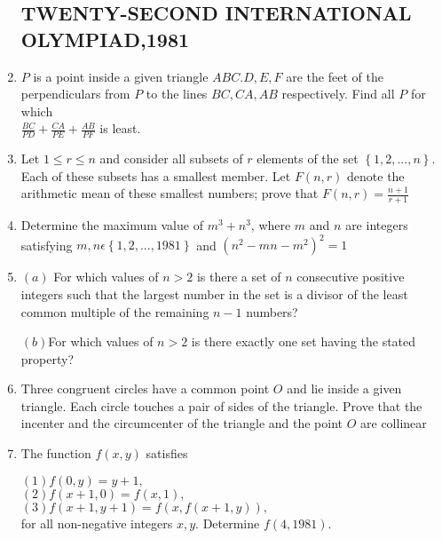 \documentclass[12pt,-letter paper]{article}
\providecommand{\cbrak}[1]{\ensuremath{\left\{#1\right\}}}
\providecommand{\brak}[1]{\ensuremath{\left(#1\right)}}
\begin{document}
\begin{enumerate}
		\subsection*{TWENTY-SECOND INTERNATIONAL OLYMPIAD,1981}
\item $P$ is a point inside a given triangle $ABC.D, E, F$ are the feet of the perpendiculars from $P$ to the lines $BC, CA, AB$ respectively. Find all $P$ for which \\ $\frac{BC}{PD}+\frac{CA}{PE}+\frac{AB}{PF}$ is least.
\item Let $1 \leq r \leq n$ and consider all subsets of $r$ elements of the set $\cbrak{1,2,..., n}$. Each of these subsets has a smallest  member. Let $F\brak{n,r}$ denote the arithmetic mean of these smallest numbers; prove that $F\brak{n,r}= \frac{n+1}{r+1}$
\item Determine the maximum value of $m^{3}+n^{3}$, where $m$ and $n$ are integers satisfying $m, n  \epsilon  \cbrak{1,2,..., 1981}$ and $\brak{n^{2}-mn-m^{2}}^{2}=1$
\item \brak{a} For which values of $n > 2$ is there a set of $n$ consecutive positive integers such that the largest number in the set is a divisor of the least common multiple of the remaining $n-1$ numbers?

	\brak{b}For which values of $n > 2$ is there exactly one set having the stated property?
\item Three congruent circles have a common point $O$ and lie inside a given triangle. Each circle touches a pair of sides of the triangle. Prove that the incenter and the circumcenter of the triangle and the point $O$  are collinear
\item The function $f\brak{x, y}$ satisfies

$\brak{1} f\brak{0, y} = y + 1,$ \\ 
$\brak{2} f\brak{x + 1, 0} = f\brak{x, 1},$ \\
$\brak{3} f(x + 1, y + 1) = f\brak{x, f\brak{x + 1, y}},$ \\
for all non-negative integers $x, y$. Determine $ f\brak{4,1981}$.
\end{enumerate}
\end{document}
